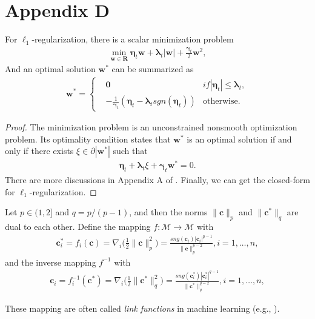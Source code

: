 \documentclass[10pt]{llncs}
\begin{document}
\section{Appendix D}
\begin{lemma}
For $\ell_1$-regularization, there is a scalar minimization problem
  \begin{align*}
    \min\limits_{\mathbf{w} \in \mathbf{R}} \mathbf{\eta}_t\mathbf{w}+\mathbf{\lambda}_t|\mathbf{w}|+\frac{\mathbf{\gamma}_t}{2}\mathbf{w}^2,
  \end{align*}
And an optimal solution $\mathbf{w}^\ast$ can be summarized as
  \begin{align*}
    \mathbf{w}^\ast=\left\{
        \begin{aligned}
        &\mathbf{0}  &if |\mathbf{\eta}_t| \leq \mathbf{\lambda}_t,\\
        &-\frac{1}{\mathbf{\gamma}_t}(\mathbf{\eta}_t-\mathbf{\lambda}_t sgn(\mathbf{\eta}_t)) &\textrm{otherwise}.
        \end{aligned}
    \right.
  \end{align*}
\end{lemma}
\begin{proof}
The minimization problem is an unconstrained nonsmooth optimization problem. Its optimality condition \cite{rockafellar2015convex} states that $\mathbf{w}^\ast$ is an optimal solution if and only if there exists $\xi \in \partial|\mathbf{w}^\ast|$ such that
\begin{align*}
    \mathbf{\eta}_t+\mathbf{\lambda}_t\xi+\mathbf{\gamma}_t\mathbf{w}^\ast=0.
\end{align*}
There are more discussions in Appendix A of \cite{Xiao10}. Finally, we can get the closed-form for $\ell_1$-regularization.
\end{proof}

\begin{lemma}
  \label{inverse-mapping}
  Let $p \in (1,2]$ and $q=p/(p-1)$, and then the norms $\|\pmb{c}\|_p$ and $\|\pmb{c}^\ast\|_q$ are dual to each other. Define the mapping $f:\mathcal{M} \to \mathcal{M}$ with
  \begin{align*}
    \pmb{c}^\ast_i=f_i(\pmb{c})=\nabla_i\Big(\frac{1}{2}\|\pmb{c}\|_p^2\Big)=\frac{sng(\pmb{c}_i)|\pmb{c}_i|^{p-1}}{\|\pmb{c}\|_p^{p-2}}, i=1,\ldots,n,
  \end{align*}
and the inverse mapping $f^{-1}$ with
  \begin{align*}
    \pmb{c}_i=f^{-1}_i(\pmb{c}^\ast)=\nabla_i\Big(\frac{1}{2}\|\pmb{c}^\ast\|_q^2\Big)=\frac{sng(\pmb{c}^\ast_i)|\pmb{c}^\ast_i|^{q-1}}{\|\pmb{c}^\ast\|_q^{q-2}}, i=1,\ldots,n,
  \end{align*}
\end{lemma}
These mapping are often called {\em link functions} in machine learning (e.g., \cite{Gentile03a}).
\end{document}
